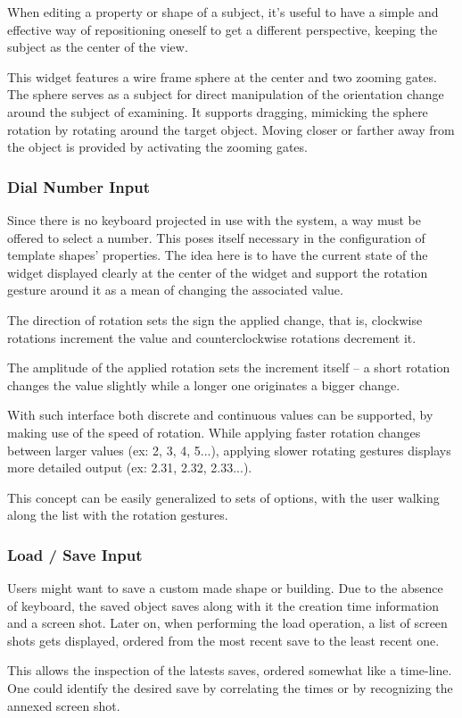 When editing a property or shape of a subject, it's useful to have a simple and effective way
of repositioning oneself to get a different perspective, keeping the subject as the center of the view.


This widget features a wire frame sphere at the center and two zooming gates.
The sphere serves as a subject for direct manipulation of the orientation change around the subject of examining.
It supports dragging, mimicking the sphere rotation by rotating around the target object.
Moving closer or farther away from the object is provided by activating the zooming gates.


\subsubsection{Dial Number Input}

Since there is no keyboard projected in use with the system, a way must be offered to select a number.
This poses itself necessary in the configuration of template shapes' properties.
The idea here is to have the current state of the widget displayed clearly at the center of the widget
and support the rotation gesture around it as a mean of changing the associated value.


The direction of rotation sets the sign the applied change, that is, clockwise rotations increment
the value and counterclockwise rotations decrement it.

The amplitude of the applied rotation sets the increment itself -- a short rotation changes the value
slightly while a longer one originates a bigger change.

With such interface both discrete and continuous values can be supported, by making use of the speed of rotation.
While applying faster rotation changes between larger values (ex: 2, 3, 4, 5...), applying slower rotating
gestures displays more detailed output (ex: 2.31, 2.32, 2.33...).

This concept can be easily generalized to sets of options, with the user walking along the list with the rotation gestures.


\subsubsection{Load / Save Input}


Users might want to save a custom made shape or building. Due to the absence of keyboard, the saved object
saves along with it the creation time information and a screen shot.
Later on, when performing the load operation, a list of screen shots gets displayed, ordered from the most
recent save to the least recent one.

This allows the inspection of the latests saves, ordered somewhat like a time-line. One could identify the
desired save by correlating the times or by recognizing the annexed screen shot.
